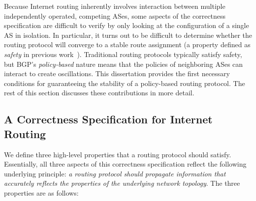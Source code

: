 Because Internet routing inherently involves interaction between
multiple independently operated, competing ASes, some aspects of the
correctness 
specification are difficult to verify by only looking at the
configuration of a single AS in isolation.  In particular, it turns out
to be difficult to determine whether the routing protocol will converge
to a stable route assignment (a property defined as {\em safety} in
previous work~\cite{Varadhan1996}).  Traditional routing protocols
typically satisfy safety, but BGP's {\em policy-based} nature means that
the policies of neighboring ASes can interact to create oscillations.
This dissertation provides the first necessary conditions for
guaranteeing the stability of a policy-based routing protocol.  The rest
of this section discusses these contributions in more detail.




\subsection{A Correctness Specification for Internet Routing}

We define three high-level properties that a routing
protocol should satisfy. Essentially, all three aspects of this
correctness specification
reflect the following underlying principle: {\em a routing protocol
should propagate 
information that accurately reflects the properties of the underlying
network topology}.  The three properties are as follows:

